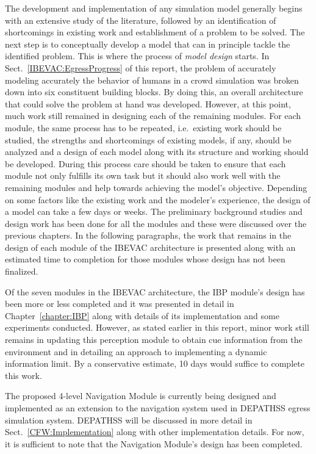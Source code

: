 The development and implementation of any simulation model generally begins with an extensive study of the literature, followed by an identification of shortcomings in existing work and establishment of a problem to be solved. The next step is to conceptually develop a model that can in principle tackle the identified problem. This is where the process of \emph{model design} starts. In Sect.~\ref{IBEVAC:EgressProgress} of this report, the problem of accurately modeling accurately the behavior of humans in a crowd simulation was broken down into six constituent building blocks. By doing this, an overall architecture that could solve the problem at hand was developed. However, at this point, much work still remained in designing each of the remaining modules. For each module, the same process has to be repeated, i.e.\ existing work should be studied, the strengths and shortcomings of existing models, if any, should be analyzed and a design of each model along with its structure and working should be developed. During this process care should be taken to ensure that each module not only fulfills its own task but it should also work well with the remaining modules and help towards achieving the model's objective. Depending on some factors like the existing work and the modeler's experience, the design of a model can take a few days or weeks. The preliminary background studies and design work has been done for all the modules and these were discussed over the previous chapters. In the following paragraphs, the work that remains in the design of each module of the IBEVAC architecture is presented along with an estimated time to completion for those modules whose design has not been finalized.

Of the seven modules in the IBEVAC architecture, the IBP module's design has been more or less completed and it was presented in detail in Chapter~\ref{chapter:IBP} along with details of its implementation and some experiments conducted. However, as stated earlier in this report, minor work still remains in updating this perception module to obtain cue information from the environment and in detailing an approach to implementing a dynamic information limit. By a conservative estimate, 10 days would suffice to complete this work.

The proposed 4-level Navigation Module is currently being designed and implemented as an extension to the navigation system used in DEPATHSS egress simulation system. DEPATHSS will be discussed in more detail in Sect.~\ref{CFW:Implementation} along with other implementation details. For now, it is sufficient to note that the Navigation Module's design has been completed. 

